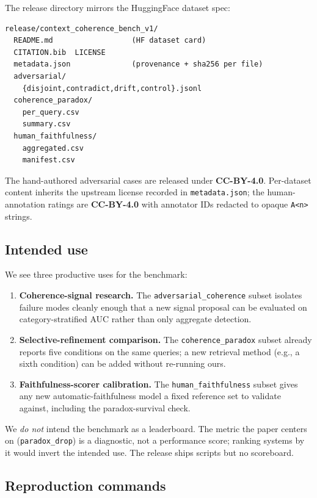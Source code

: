 The release directory mirrors the HuggingFace dataset spec:

\begin{verbatim}
release/context_coherence_bench_v1/
  README.md                  (HF dataset card)
  CITATION.bib  LICENSE
  metadata.json              (provenance + sha256 per file)
  adversarial/
    {disjoint,contradict,drift,control}.jsonl
  coherence_paradox/
    per_query.csv
    summary.csv
  human_faithfulness/
    aggregated.csv
    manifest.csv
\end{verbatim}

The hand-authored adversarial cases are released under \textbf{CC-BY-4.0}.
Per-dataset content inherits the upstream license recorded in
\texttt{metadata.json}; the human-annotation ratings are
\textbf{CC-BY-4.0} with annotator IDs redacted to opaque \texttt{A<n>}
strings.

\subsection{Intended use}

We see three productive uses for the benchmark:

\begin{enumerate}
  \item \textbf{Coherence-signal research.} The
        \texttt{adversarial\_coherence} subset isolates failure modes
        cleanly enough that a new signal proposal can be evaluated on
        category-stratified AUC rather than only aggregate detection.
  \item \textbf{Selective-refinement comparison.} The
        \texttt{coherence\_paradox} subset already reports five
        conditions on the same queries; a new retrieval method (e.g., a
        sixth condition) can be added without re-running ours.
  \item \textbf{Faithfulness-scorer calibration.} The
        \texttt{human\_faithfulness} subset gives any new
        automatic-faithfulness model a fixed reference set to validate
        against, including the paradox-survival check.
\end{enumerate}

We \emph{do not} intend the benchmark as a leaderboard. The metric the
paper centers on (\texttt{paradox\_drop}) is a diagnostic, not a
performance score; ranking systems by it would invert the intended use.
The release ships scripts but no scoreboard.

\subsection{Reproduction commands}

